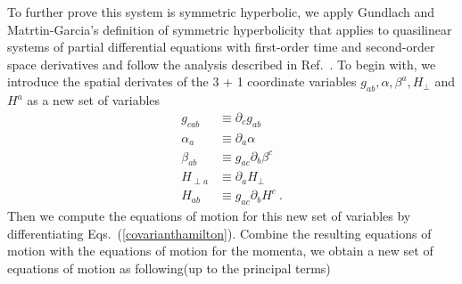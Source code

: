 To further prove this system is symmetric hyperbolic, we apply Gundlach and Matrtin-Garcia\cite{Gundlach:2005ta}'s definition of symmetric hyperbolicity that applies to quasilinear systems of partial differential equations with first-order time and second-order space derivatives and follow the analysis described in Ref.~\cite{Brown:2011qg}. To begin with, we introduce the spatial derivates of the 3 + 1 coordinate variables $g_{ab}, \alpha, \beta^{a}, H_{\perp}$ and $H^{a}$ as a new set of variables
\begin{subequations}
\begin{align}
g_{cab} & \equiv \partial_{c}g_{ab}\\
\alpha_{a} & \equiv \partial_{a}\alpha\\
\beta_{ab} & \equiv g_{ac}\partial_{b}\beta^{c}\\
H_{\perp a} & \equiv \partial_{a}H_{\perp}\\
H_{ab} & \equiv g_{ac}\partial_{b}H^{c} \ .
\end{align}
\end{subequations}
Then we compute the equations of motion for this new set of variables by differentiating Eqs.~(\ref{covarianthamilton}). Combine the resulting equations of motion with the equations of motion for the momenta, we obtain a new set of equations of motion as following(up to the principal terms)

